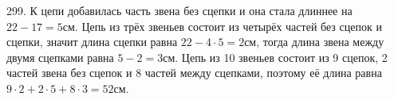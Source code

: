 299. К цепи добавилась часть звена без сцепки и она стала длиннее на $22-17=5$см. Цепь из трёх звеньев состоит из четырёх частей без сцепок и сцепки, значит длина сцепки равна $22-4\cdot5=2$см, тогда длина звена между двумя сцепками равна $5-2=3$см. Цепь из 10 звеньев состоит из 9 сцепок, 2 частей звена без сцепок и 8 частей между сцепками, поэтому её длина равна $9\cdot2+2\cdot5+8\cdot3=52$см.\\
